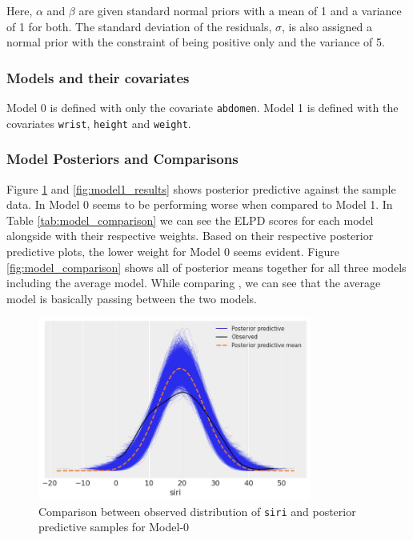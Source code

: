 \documentclass[12 pt]{scrartcl}
\begin{document}
	Here, $\alpha$ and $\beta$ are given standard normal priors with a mean of 1 and a variance of 1 for both. The standard deviation of the residuals, $\sigma$, is also assigned a normal prior with the constraint of being positive only and the variance of 5.
	
	\subsubsection{Models and their covariates}
	
	Model 0 is defined with only the covariate \texttt{abdomen}. Model 1 is defined with the covariates \texttt{wrist}, \texttt{height} and \texttt{weight}.
	
	\subsubsection{Model Posteriors and Comparisons}
	Figure \ref{fig:model0_results} and \ref{fig:model1_results} shows posterior predictive against the sample data. In Model 0 seems to be performing worse when compared to Model 1.  In Table \ref{tab:model_comparison} we can see the ELPD scores for each model alongside with their respective weights. Based on their respective posterior predictive plots, the lower weight for Model 0 seems evident. Figure \ref{fig:model_comparison} shows all of posterior means together for all three models including the average model. While comparing , we can see that the average model is basically passing between the two models. 
	
	\begin{figure}[h!]
		\centering
		\includegraphics[width=0.8\textwidth]{Figures/2.jpeg}
		\caption{Comparison between observed distribution of \texttt{siri} and posterior predictive samples for Model-0}
		\label{fig:model0_results}
	\end{figure}
	
\end{document}
